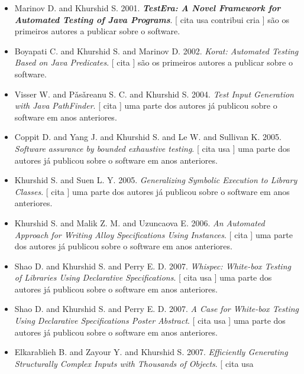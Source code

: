 \begin{itemize}
\item Marinov D. and Khurshid S.
      2001.
        \textbf{\textit{ TestEra: A Novel Framework for Automated Testing of Java Programs}}.
      [
          cita
          usa
          contribui
          cria
      ]
são os primeiros autores a publicar sobre o software.
\item Boyapati C. and Khurshid S. and Marinov D.
      2002.
        \textit{ Korat: Automated Testing Based on Java Predicates}.
      [
          cita
      ]
são os primeiros autores a publicar sobre o software.
\item Visser W. and P\v{a}s\v{a}reanu S. C. and Khurshid S.
      2004.
        \textit{ Test Input Generation with Java PathFinder}.
      [
          cita
      ]
uma parte dos autores já publicou sobre o software em anos anteriores.
\item Coppit D. and Yang J. and Khurshid S. and Le W. and Sullivan K.
      2005.
        \textit{ Software assurance by bounded exhaustive testing}.
      [
          cita
          usa
      ]
uma parte dos autores já publicou sobre o software em anos anteriores.
\item Khurshid S. and Suen L. Y.
      2005.
        \textit{ Generalizing Symbolic Execution to Library Classes}.
      [
          cita
      ]
uma parte dos autores já publicou sobre o software em anos anteriores.
\item Khurshid S. and Malik Z. M. and Uzuncaova E.
      2006.
        \textit{ An Automated Approach for Writing Alloy Specifications Using Instances}.
      [
          cita
      ]
uma parte dos autores já publicou sobre o software em anos anteriores.
\item Shao D. and Khurshid S. and Perry E. D.
      2007.
        \textit{ Whispec: White-box Testing of Libraries Using Declarative Specifications}.
      [
          cita
          usa
      ]
uma parte dos autores já publicou sobre o software em anos anteriores.
\item Shao D. and Khurshid S. and Perry E. D.
      2007.
        \textit{ A Case for White-box Testing Using Declarative Specifications Poster Abstract}.
      [
          cita
          usa
      ]
uma parte dos autores já publicou sobre o software em anos anteriores.
\item Elkarablieh B. and Zayour Y. and Khurshid S.
      2007.
        \textit{ Efficiently Generating Structurally Complex Inputs with Thousands of Objects}.
      [
          cita
          usa

\end{itemize}

